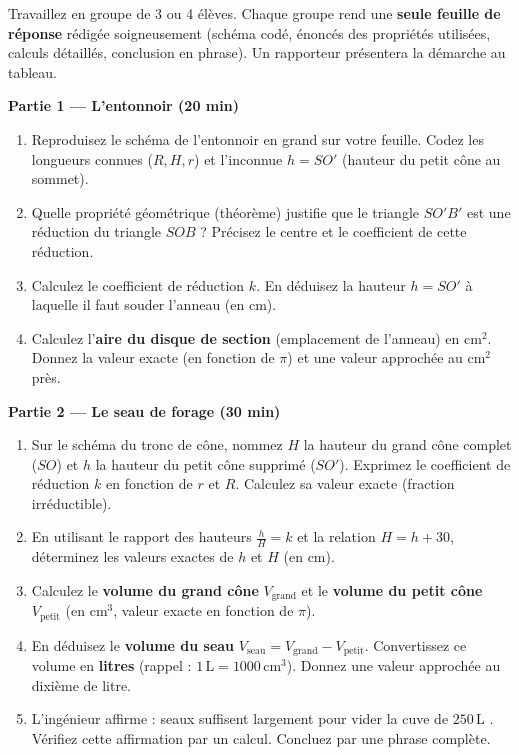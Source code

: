 \documentclass[11pt]{article}
\newcommand{\cle}[1]{{\popxbold\color{popdark}#1}}
\newcounter{popsec}
\newcounter{popsub}
\newcommand{\courssub}[1]{%
  \stepcounter{popsub}%
  \par\vspace{9pt}\noindent{\popxbold\fontsize{11.5}{13}\selectfont\color{popink}{\color{poporange}\thepopsec.\thepopsub}\hspace{6pt}#1}\par\nopagebreak\vspace{4pt}
}
\begin{document}
\courssub{Consignes}
Travaillez en groupe de 3 ou 4 élèves. Chaque groupe rend une \textbf{seule feuille de réponse} rédigée soigneusement (schéma codé, énoncés des propriétés utilisées, calculs détaillés, conclusion en phrase). Un rapporteur présentera la démarche au tableau.

\vspace{0,2cm}
\noindent\textbf{Partie 1 — L'entonnoir (20 min)}
\begin{enumerate}
    \item Reproduisez le schéma de l'entonnoir en grand sur votre feuille. Codez les longueurs connues ($R, H, r$) et l'inconnue $h = SO'$ (hauteur du petit cône au sommet).
    \item Quelle propriété géométrique (théorème) justifie que le triangle $SO'B'$ est une réduction du triangle $SOB$ ? Précisez le centre et le coefficient de cette réduction.
    \item Calculez le \cle{coefficient de réduction} $k$. En déduisez la hauteur $h = SO'$ à laquelle il faut souder l'anneau (en cm).
    \item Calculez l'\textbf{aire du disque de section} (emplacement de l'anneau) en $\text{cm}^2$. Donnez la valeur exacte (en fonction de $\pi$) et une valeur approchée au $\text{cm}^2$ près.
\end{enumerate}

\vspace{0,2cm}
\noindent\textbf{Partie 2 — Le seau de forage (30 min)}
\begin{enumerate}[resume]
    \item Sur le schéma du tronc de cône, nommez $H$ la hauteur du grand cône complet ($SO$) et $h$ la hauteur du petit cône supprimé ($SO'$). Exprimez le coefficient de réduction $k$ en fonction de $r$ et $R$. Calculez sa valeur exacte (fraction irréductible).
    \item En utilisant le rapport des hauteurs $\frac{h}{H} = k$ et la relation $H = h + 30$, déterminez les valeurs exactes de $h$ et $H$ (en cm).
    \item Calculez le \textbf{volume du grand cône} $V_{\text{grand}}$ et le \textbf{volume du petit cône} $V_{\text{petit}}$ (en $\text{cm}^3$, valeur exacte en fonction de $\pi$).
    \item En déduisez le \textbf{volume du seau} $V_{\text{seau}} = V_{\text{grand}} - V_{\text{petit}}$. Convertissez ce volume en \textbf{litres} (rappel : $1\,\text{L} = 1000\,\text{cm}^3$). Donnez une valeur approchée au dixième de litre.
    \item L'ingénieur affirme :  seaux suffisent largement pour vider la cuve de $250\,\text{L}$ \fg{}. Vérifiez cette affirmation par un calcul. Concluez par une phrase complète.
\end{enumerate}
\end{document}
